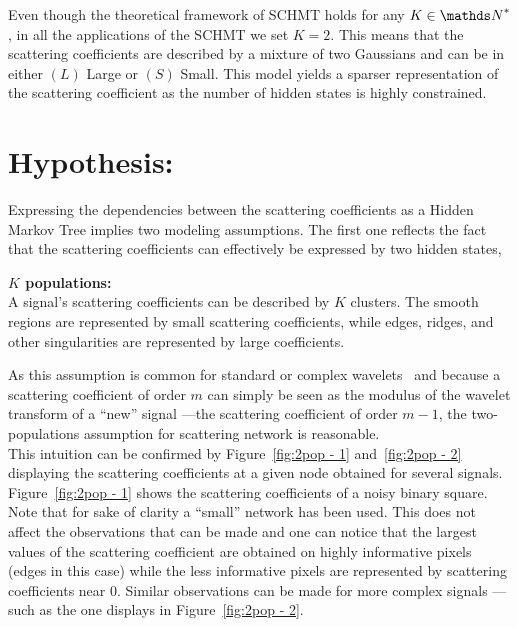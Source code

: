 \documentclass[a4paper,11pt]{report}
\begin{document}
    Even though the theoretical framework of SCHMT holds for any $K \in \dsN^{\ast}$, in all the applications of the SCHMT we set $K=2$. This means that the scattering coefficients are described by a mixture of two Gaussians and can be in either $(L)$ Large or $(S)$ Small. This model yields a sparser representation of the scattering coefficient as the number of hidden states is highly constrained.
    
    
  \section{Hypothesis:}
    \label{sec:SCHMT/Hypos}
    
    Expressing the dependencies between the scattering coefficients as a Hidden Markov Tree implies two modeling assumptions. The first one reflects the fact that the scattering coefficients can effectively be expressed by two hidden states,\\
    
    \begin{assumption}\textbf{$K$ populations:}\\
			A signal's scattering coefficients can be described by $K$ clusters. The smooth regions are represented by small scattering coefficients, while edges, ridges, and other singularities are represented by large coefficients.\\
			\label{assum:2pop}
    \end{assumption}
    
    As this assumption is common for standard or complex wavelets~\citep{kingsbury2001complex} and because a scattering coefficient of order $m$ can simply be seen as the modulus of the wavelet transform of a ``new'' signal ---\ie the scattering coefficient of order $m-1$, the two-populations assumption for scattering network is reasonable.\\
    
    This intuition can be confirmed by Figure~\ref{fig:2pop - 1} and~\ref{fig:2pop - 2} displaying the scattering coefficients at a given node obtained for several signals. Figure~\ref{fig:2pop - 1} shows the scattering coefficients of a noisy binary square. Note that for sake of clarity a ``small'' network has been used. This does not affect the observations that can be made and one can notice that the largest values of the scattering coefficient are obtained on highly informative pixels (edges in this case) while the less informative pixels are represented by scattering coefficients near $0$. Similar observations can be made for more complex signals ---such as the one displays in Figure~\ref{fig:2pop - 2}.\\
 
\end{document}
